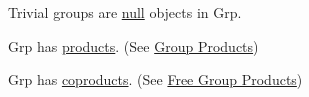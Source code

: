 \begin{proposition}
Trivial groups are \hyperref[null]{null} objects in Grp.
\end{proposition}

\begin{proposition}
Grp has \hyperref[products]{products}. (See \hyperref[groupproduct]{Group Products})
\end{proposition}

\begin{proposition}
Grp has \hyperref[coproducts]{coproducts}. (See \hyperref[freegroupproduct]{Free Group Products})
\end{proposition}